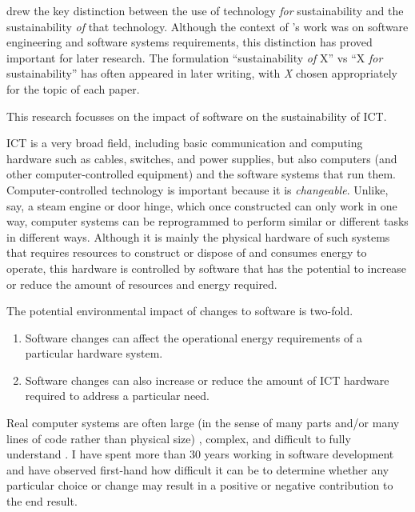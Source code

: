 \label{A63}
\citet{Penzenstadler2013} drew the key distinction between the use of technology \emph{for} sustainability and the sustainability \emph{of} that technology. Although the context of \citeauthor{Penzenstadler2013}'s work was on software engineering and software systems requirements, this distinction has proved important for later research. The formulation \enquote{sustainability \emph{of} X} vs \enquote{X \emph{for} sustainability} has often appeared in later writing, with \emph{X} chosen appropriately for the topic of each paper.

\begin{leftbar}
This research focusses on the impact of software on the sustainability of \gls{ICT}.
\end{leftbar}

\gls{ICT} is a very broad field, including basic communication and computing hardware such as cables, switches, and power supplies, but also computers (and other computer-controlled equipment) and the software systems that run them.  Computer-controlled technology is important because it is \emph{changeable}. Unlike, say, a steam engine or door hinge, which once constructed can only work in one way, computer systems can be reprogrammed to perform similar or different tasks in different ways. Although it is mainly the physical hardware of such systems that requires resources to construct or dispose of and consumes energy to operate, this hardware is controlled by software that has the potential to increase or reduce the amount of resources and energy required.

The potential environmental impact of changes to software is two-fold.

\label{A7}
\begin{enumerate}
\item Software changes can affect the operational energy requirements of a particular hardware system.
\item Software changes can also increase or reduce the amount of \gls{ICT} hardware required to address a particular need.
\end{enumerate}

Real computer systems are often large (in the sense of many parts and/or many lines of code rather than physical size) \citep{McCandless2015}, complex, and difficult to fully understand \citep{Peitek2021}. I have spent more than 30 years working in software development and have observed first-hand how difficult it can be to determine whether any particular choice or change may result in a positive or negative contribution to the end result.

